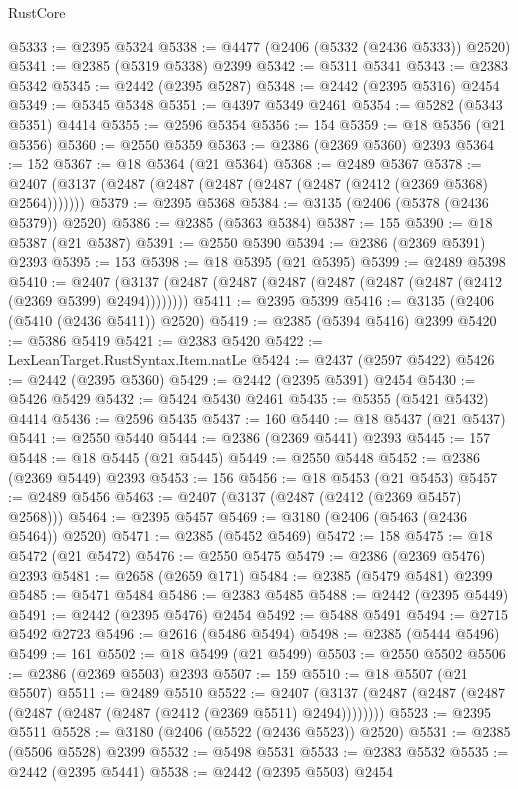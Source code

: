 \begin{lexlean}{RustCore}
\begin{coremodule}
@5333 := @2395 @5324
@5338 := @4477 (@2406 (@5332 (@2436 @5333)) @2520)
@5341 := @2385 (@5319 @5338) @2399
@5342 := @5311 @5341
@5343 := @2383 @5342
@5345 := @2442 (@2395 @5287)
@5348 := @2442 (@2395 @5316) @2454
@5349 := @5345 @5348
@5351 := @4397 @5349 @2461
@5354 := @5282 (@5343 @5351) @4414
@5355 := @2596 @5354
@5356 := 154
@5359 := @18 @5356 (@21 @5356)
@5360 := @2550 @5359
@5363 := @2386 (@2369 @5360) @2393
@5364 := 152
@5367 := @18 @5364 (@21 @5364)
@5368 := @2489 @5367
@5378 := @2407 (@3137 (@2487 (@2487 (@2487 (@2487 (@2487 (@2412 (@2369 @5368) @2564)))))))
@5379 := @2395 @5368
@5384 := @3135 (@2406 (@5378 (@2436 @5379)) @2520)
@5386 := @2385 (@5363 @5384)
@5387 := 155
@5390 := @18 @5387 (@21 @5387)
@5391 := @2550 @5390
@5394 := @2386 (@2369 @5391) @2393
@5395 := 153
@5398 := @18 @5395 (@21 @5395)
@5399 := @2489 @5398
@5410 := @2407 (@3137 (@2487 (@2487 (@2487 (@2487 (@2487 (@2487 (@2412 (@2369 @5399) @2494))))))))
@5411 := @2395 @5399
@5416 := @3135 (@2406 (@5410 (@2436 @5411)) @2520)
@5419 := @2385 (@5394 @5416) @2399
@5420 := @5386 @5419
@5421 := @2383 @5420
@5422 := LexLeanTarget.RustSyntax.Item.natLe
@5424 := @2437 (@2597 @5422)
@5426 := @2442 (@2395 @5360)
@5429 := @2442 (@2395 @5391) @2454
@5430 := @5426 @5429
@5432 := @5424 @5430 @2461
@5435 := @5355 (@5421 @5432) @4414
@5436 := @2596 @5435
@5437 := 160
@5440 := @18 @5437 (@21 @5437)
@5441 := @2550 @5440
@5444 := @2386 (@2369 @5441) @2393
@5445 := 157
@5448 := @18 @5445 (@21 @5445)
@5449 := @2550 @5448
@5452 := @2386 (@2369 @5449) @2393
@5453 := 156
@5456 := @18 @5453 (@21 @5453)
@5457 := @2489 @5456
@5463 := @2407 (@3137 (@2487 (@2412 (@2369 @5457) @2568)))
@5464 := @2395 @5457
@5469 := @3180 (@2406 (@5463 (@2436 @5464)) @2520)
@5471 := @2385 (@5452 @5469)
@5472 := 158
@5475 := @18 @5472 (@21 @5472)
@5476 := @2550 @5475
@5479 := @2386 (@2369 @5476) @2393
@5481 := @2658 (@2659 @171)
@5484 := @2385 (@5479 @5481) @2399
@5485 := @5471 @5484
@5486 := @2383 @5485
@5488 := @2442 (@2395 @5449)
@5491 := @2442 (@2395 @5476) @2454
@5492 := @5488 @5491
@5494 := @2715 @5492 @2723
@5496 := @2616 (@5486 @5494)
@5498 := @2385 (@5444 @5496)
@5499 := 161
@5502 := @18 @5499 (@21 @5499)
@5503 := @2550 @5502
@5506 := @2386 (@2369 @5503) @2393
@5507 := 159
@5510 := @18 @5507 (@21 @5507)
@5511 := @2489 @5510
@5522 := @2407 (@3137 (@2487 (@2487 (@2487 (@2487 (@2487 (@2487 (@2412 (@2369 @5511) @2494))))))))
@5523 := @2395 @5511
@5528 := @3180 (@2406 (@5522 (@2436 @5523)) @2520)
@5531 := @2385 (@5506 @5528) @2399
@5532 := @5498 @5531
@5533 := @2383 @5532
@5535 := @2442 (@2395 @5441)
@5538 := @2442 (@2395 @5503) @2454

\end{coremodule}
\end{lexlean}
